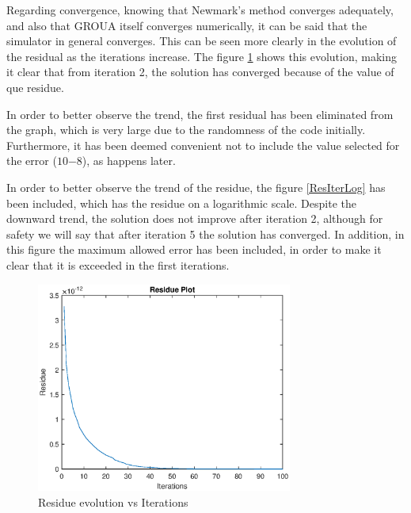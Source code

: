 \documentclass{ws-m3as}
\begin{document}

Regarding convergence, knowing that Newmark's method converges adequately, and also that GROUA itself converges numerically, it can be said that the simulator in general converges. This can be seen more clearly in the evolution of the residual as the iterations increase. The figure \ref{ResIter} shows this evolution, making it clear that from iteration 2, the solution has converged because of the value of que residue. %

In order to better observe the trend, the first residual has been eliminated from the graph, which is very large due to the randomness of the code initially. Furthermore, it has been deemed convenient not to include the value selected for the error ($ 10{-8}$), as happens later.

In order to better observe the trend of the residue, the figure \ref{ResIterLog} has been included, which has the residue on a logarithmic scale. Despite the downward trend, the solution does not improve after iteration 2, although for safety we will say that after iteration 5 the solution has converged. In addition, in this figure the maximum allowed error has been included, in order to make it clear that it is exceeded in the first iterations.

\begin{figure}
\centering
\includegraphics[width=0.75\textwidth]{ResIter.eps}
\caption{Residue evolution vs Iterations } 
\label{ResIter}
\end{figure}
\end{document}
